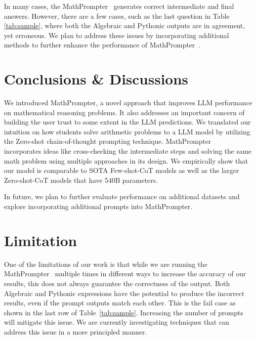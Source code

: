 In many cases, the MathPrompter~ generates correct intermediate and final answers. However, there are a few cases, such as the last question in Table \ref{tab:sample}, where both the Algebraic and Pythonic outputs are in agreement, yet erroneous. We plan to address these issues by incorporating additional methods to further enhance the performance of MathPrompter~.

\section{Conclusions \& Discussions}

We introduced MathPrompter, a novel approach that improves LLM performance on mathematical reasoning problems. It also addresses an important concern of building the user trust to some extent in the LLM predictions. We translated our intuition on how students solve arithmetic problems to a LLM model by utilizing the Zero-shot chain-of-thought prompting technique. MathPrompter~ incorporates ideas like cross-checking the intermediate steps and solving the same math problem using multiple approaches in its design. We empirically show that our model is comparable to SOTA Few-shot-CoT models as well as the larger Zero-shot-CoT models that have 540B parameters.

In future, we plan to further evaluate performance on additional datasets and explore incorporating additional prompts into MathPrompter.

\section{Limitation}
One of the limitations of our work is that while we are running the MathPrompter~ multiple times in different ways to increase the accuracy of our results, this does not always guarantee the correctness of the output. Both Algebraic and Pythonic expressions have the potential to produce the incorrect results, even if the prompt outputs match each other. This is the fail case as shown in the last row of Table~\ref{tab:sample}. Increasing the number of prompts will mitigate this issue. We are currently investigating techniques that can address this issue in a more principled manner.


